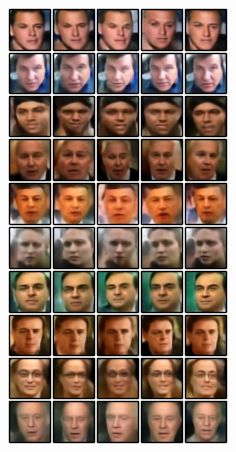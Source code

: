 \documentclass{article} %
\begin{document}
\begin{figure}[!hb]
\begin{minipage}{0.3\textwidth}
\includegraphics[width=1\linewidth]{output_faces_rgb.png}
\end{minipage}
\begin{minipage}{0.3\textwidth}

\end{minipage}
\end{figure}
\end{document}
